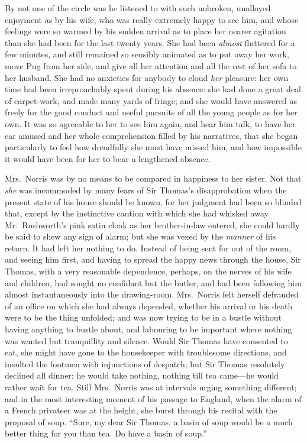 \documentclass{article}
\begin{document}
By not one of the circle was he listened to with such unbroken,
unalloyed enjoyment as by his wife, who was really
extremely happy to see him, and whose feelings were
so warmed by his sudden arrival as to place her nearer
agitation than she had been for the last twenty years.
She had been \emph{almost} fluttered for a few minutes,
and still remained so sensibly animated as to put away
her work, move Pug from her side, and give all her
attention and all the rest of her sofa to her husband.
She had no anxieties for anybody to cloud \emph{her} pleasure:
her own time had been irreproachably spent during his absence:
she had done a great deal of carpet-work, and made many
yards of fringe; and she would have answered as freely
for the good conduct and useful pursuits of all the young
people as for her own.  It was so agreeable to her to see
him again, and hear him talk, to have her ear amused
and her whole comprehension filled by his narratives,
that she began particularly to feel how dreadfully she
must have missed him, and how impossible it would have
been for her to bear a lengthened absence.

Mrs.\ Norris was by no means to be compared in happiness
to her sister.  Not that \emph{she} was incommoded by many
fears of Sir Thomas's disapprobation when the present
state of his house should be known, for her judgment
had been so blinded that, except by the instinctive
caution with which she had whisked away Mr.\ Rushworth's
pink satin cloak as her brother-in-law entered,
she could hardly be said to shew any sign of alarm;
but she was vexed by the \emph{manner} of his return.
It had left her nothing to do.  Instead of being sent
for out of the room, and seeing him first, and having
to spread the happy news through the house, Sir Thomas,
with a very reasonable dependence, perhaps, on the nerves
of his wife and children, had sought no confidant but
the butler, and had been following him almost instantaneously
into the drawing-room. Mrs.\ Norris felt herself defrauded
of an office on which she had always depended, whether his
arrival or his death were to be the thing unfolded;
and was now trying to be in a bustle without having
anything to bustle about, and labouring to be important
where nothing was wanted but tranquillity and silence.
Would Sir Thomas have consented to eat, she might have gone
to the housekeeper with troublesome directions, and insulted
the footmen with injunctions of despatch; but Sir Thomas
resolutely declined all dinner:  he would take nothing,
nothing till tea came---he would rather wait for tea.
Still Mrs.\ Norris was at intervals urging something different;
and in the most interesting moment of his passage to England,
when the alarm of a French privateer was at the height,
she burst through his recital with the proposal of soup.
``Sure, my dear Sir Thomas, a basin of soup would be
a much better thing for you than tea.  Do have a basin
of soup.''
\end{document}
